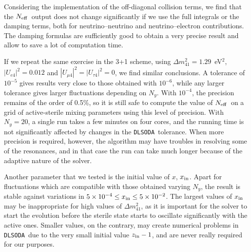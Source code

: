 \documentclass[notitlepage,showpacs,preprintnumbers,amsmath,amssymb,superscriptaddress,prd,onecolumn]{revtex4-1}
\newcommand{\Neff}{\ensuremath{N_{\rm eff}}}
\newcommand{\dmsq}[1]{\ensuremath{\Delta m^2_{#1}}}
\newcommand{\uasq}[1]{\ensuremath{|U_{#1 4}|^2}}
\newcommand{\e}[1]{\ensuremath{\times10^{#1}}}
\newcommand{\dlsoda}{\texttt{DLSODA}}
\begin{document}
Considering the implementation of the off-diagonal collision terms,
we find that the \Neff\ output does not change significantly if we use the full integrals or the damping terms,
both for neutrino--neutrino and neutrino--electron contributions.
The damping formulas are sufficiently good to obtain a very precise result and allow to save
a lot of computation time.

If we repeat the same exercise in the 3+1 scheme,
using $\dmsq{41}=1.29$~eV$^2$,
$\uasq{e}=0.012$ \cite{Gariazzo:2018mwd} and $\uasq{\mu}=\uasq{\tau}=0$,
we find similar conclusions.
A tolerance of $10^{-5}$ gives results very close to those obtained with $10^{-6}$,
while any larger tolerance gives larger fluctuations depending on $N_y$.
With $10^{-4}$, the precision remains of the order of 0.5\%, so it is still safe to compute the value of \Neff\ on a grid of active-sterile mixing parameters
using this level of precision.
With $N_y=20$, a single run takes a few minutes on four cores, and the running time is not significantly affected
by changes in the \dlsoda\ tolerance.
When more precision is required, however, the algorithm may have troubles in resolving some of the resonances,
and in that case the run can take much longer because of the adaptive nature of the solver.

Another parameter that we tested is the initial value of $x$, $x_{\rm in}$.
Apart for fluctuations which are compatible with those obtained varying $N_y$,
the result is stable against variations in $5\e{-4}\leq x_{\rm in}\leq5\e{-2}$.
The largest values of $x_{\rm in}$ may be inappropriate for high values of \dmsq{41},
as it is important for the solver to start the evolution before the sterile state
starts to oscillate significantly with the active ones.
Smaller values, on the contrary, may create numerical problems in \dlsoda\
due to the very small initial value $z_{\rm in}-1$,
and are never really required for our purposes.
\end{document}
